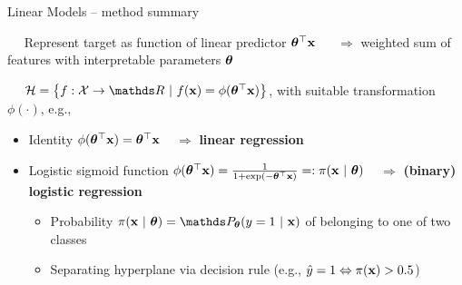 \begin{vbframe}{Linear Models -- method summary}

   
 
\medskip

 ~~ Represent target as function of linear predictor
$\bm{\theta}^\top \mathbf{x}$ ~~ $\Rightarrow$ weighted sum of features with interpretable parameters 
$\bm{\theta}$

\medskip

 ~~
$\Hspace = \left\{f: \Xspace \to \R ~|~\fx = \phi(\thetab^\top \xv)\right\}$, 
with suitable transformation $\phi(\cdot)$, e.g.,

\begin{itemize}
  \item Identity $\phi(\bm{\theta}^\top \mathbf{x}) = \bm{\theta}^\top \mathbf{x}$ 
  ~ $\Rightarrow$ \textbf{linear regression}
  \item Logistic sigmoid function $\phi(\bm{\theta}^\top \mathbf{x}) = \frac{1}{1 + \exp(- \bm{\theta}^\top \mathbf{x})} 
  =: \pi(\mathbf{x}~|~ \bm{\theta})$
  ~ $\Rightarrow$ \textbf{(binary) logistic regression}
  \begin{itemize}
    
    \item Probability $\pixt = \P_{\thetab} (y = 1 ~|~ \xv)$
    of belonging to one of two classes
    \item Separating hyperplane via decision rule 
    (e.g., $\hat{y} = 1 \Leftrightarrow \pi(\mathbf{x}) > 0.5$)
  \end{itemize}
\end{itemize}


\end{vbframe}

